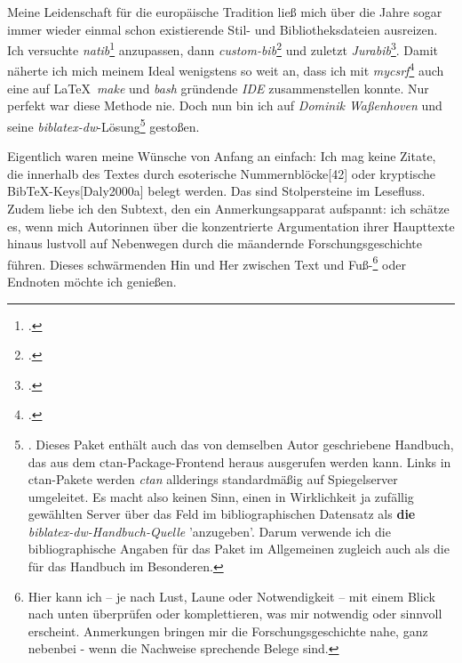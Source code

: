 Meine Leidenschaft für die europäische Tradition ließ mich über die Jahre sogar immer wieder einmal schon existierende Stil- und Bibliotheksdateien ausreizen. Ich versuchte \emph{natib}\footcite[vgl.][]{Daly2000a} anzupassen, dann \emph{custom-bib}\footcite[vgl.][]{Daly2007a} und zuletzt \emph{Jurabib}\footcite[vgl.][]{Berger2004a}. Damit näherte ich mich meinem Ideal wenigstens so weit an, dass ich mit  \emph{mycsrf}\footcite[vgl.][]{Reincke2021a} auch eine auf \LaTeX\, \emph{make} und \emph{bash} gründende \emph{IDE} zusammenstellen konnte. Nur perfekt war diese Methode nie. Doch nun bin ich auf \emph{Dominik Waßenhoven} und seine \emph{biblatex-dw}-Lösung\footnote{\cite[vgl.][]{Waßenhoven2016a}. Dieses Paket enthält auch das von demselben Autor geschriebene Handbuch, das aus dem {ctan}-Package-Frontend heraus ausgerufen werden kann. Links in ctan-Pakete werden \emph{ctan} allderings standardmäßig auf Spiegelserver umgeleitet. Es macht also keinen Sinn, einen in Wirklichkeit ja zufällig gewählten Server über das Feld  im bibliographischen Datensatz als \textbf{die} \emph{biblatex-dw-Handbuch-Quelle} 'anzugeben'. Darum verwende ich die bibliographische Angaben für das Paket im Allgemeinen zugleich auch als die für das Handbuch im Besonderen.} gestoßen.

Eigentlich waren meine Wünsche von Anfang an einfach: Ich mag keine Zitate, die innerhalb des Textes durch esoterische Nummernblöcke[42] oder kryptische Bib\TeX-Keys[Daly2000a] belegt werden. Das sind Stolpersteine im Lesefluss. Zudem liebe ich den Subtext, den ein Anmerkungsapparat aufspannt: ich schätze es, wenn mich Autorinnen über die konzentrierte Argumentation ihrer Haupttexte hinaus lustvoll auf Nebenwegen durch die mäandernde Forschungsgeschichte führen. Dieses schwärmenden Hin und Her zwischen Text und Fuß-\footnote{Hier kann ich -- je nach Lust, Laune oder Notwendigkeit -- mit einem Blick nach unten überprüfen oder komplettieren, was mir notwendig oder sinnvoll erscheint. Anmerkungen bringen mir die Forschungsgeschichte nahe, ganz nebenbei - wenn die Nachweise sprechende Belege sind.} oder Endnoten möchte ich genießen.

